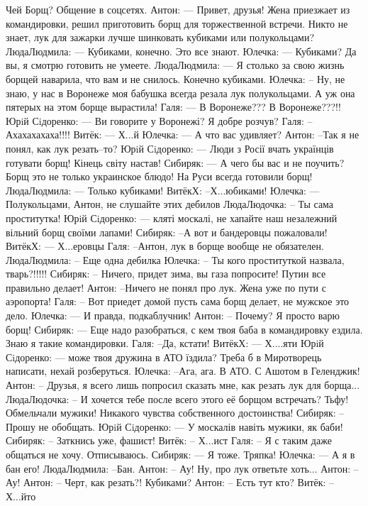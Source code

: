 \begin{itemize}
\obeycr
Чей Борщ?
Общение в соцсетях.
Антон:
— Привет, друзья! Жена приезжает из командировки, решил приготовить борщ для торжественной встречи. Никто не знает, лук для зажарки лучше шинковать кубиками или полукольцами?
ЛюдаЛюдмила:
— Кубиками, конечно. Это все знают.
Юлечка:
— Кубиками? Да вы, я смотрю готовить не умеете.
ЛюдаЛюдмила:
— Я столько за свою жизнь борщей наварила, что вам и не снилось. Конечно кубиками.
Юлечка:
– Ну, не знаю, у нас в Воронеже моя бабушка всегда резала лук полукольцами. А уж она пятерых на этом борще вырастила!
Галя:
— В Воронеже??? В Воронеже???!!
Юрiй Сiдоренко:
— Ви говорите у Воронежі? Я добре розчув?
Галя:
–Ахахахахаха!!!!
Витёк:
— Х...й
Юлечка:
— А что вас удивляет?
Антон:
–Так я не понял, как лук резать–то?
Юрiй Сiдоренко:
— Люди з Росії вчать українців готувати борщ! Кінець світу настав!
Сибиряк:
— А чего бы вас и не поучить? Борщ это не только украинское блюдо! На Руси всегда готовили борщ!
ЛюдаЛюдмила:
— Только кубиками!
ВитёкХ:
–Х...юбиками!
Юлечка:
— Полукольцами, Антон, не слушайте этих дебилов
ЛюдаЛюдочка:
– Ты сама проститутка!
Юрiй Сiдоренко:
— кляті москалі, не хапайте наш незалежний вільний борщ своїми лапами!
Сибиряк:
–А вот и бандеровцы пожаловали!
ВитёкХ:
— Х...еровцы
Галя:
–Антон, лук в борще вообще не обязателен.
ЛюдаЛюдмила:
– Еще одна дебилка
Юлечка:
– Ты кого проституткой назвала, тварь?!!!!!
Сибиряк:
– Ничего, придет зима, вы газа попросите! Путин все правильно делает!
Антон:
–Ничего не понял про лук. Жена уже по пути с аэропорта!
Галя:
– Вот приедет домой пусть сама борщ делает, не мужское это дело.
Юлечка:
— И правда, подкаблучник!
Антон:
– Почему? Я просто варю борщ!
Сибиряк:
— Еще надо разобраться, с кем твоя баба в командировку ездила. Знаю я такие командировки.
Галя:
–Да, кстати!
ВитёкХ:
— Х....яти
Юрiй Сiдоренко:
— може твоя дружина в АТО їздила? Треба б в Миротворець написати, нехай розберуться.
Юлечка:
–Ага, ага. В АТО. С Ашотом в Геленджик!
Антон:
– Друзья, я всего лишь попросил сказать мне, как резать лук для борща...
ЛюдаЛюдочка:
– И хочется тебе после всего этого её борщом встречать? Тьфу! Обмельчали мужики! Никакого чувства собственного достоинства!
Сибиряк:
– Прошу не обобщать.
Юрiй Сiдоренко:
— У москалів навіть мужики, як баби!
Сибиряк:
– Заткнись уже, фашист!
Витёк:
– Х...ист
Галя:
– Я с таким даже общаться не хочу. Отписываюсь.
Сибиряк:
— Я тоже. Тряпка!
Юлечка:
— А я в бан его!
ЛюдаЛюдмила:
–Бан.
Антон:
– Ау! Ну, про лук ответьте хоть...
Антон:
–Ау!
Антон:
– Черт, как резать?! Кубиками?
Антон:
– Есть тут кто?
Витёк:
– Х...йто
\restorecr

\begin{itemize}
 

\end{itemize}
\end{itemize}
